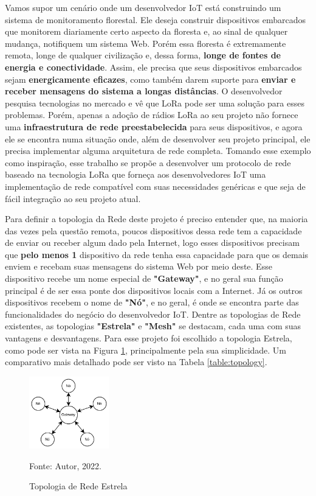 Vamos supor um cenário onde um desenvolvedor IoT está construindo um sistema
de monitoramento florestal. Ele deseja construir dispositivos embarcados que
monitorem diariamente certo aspecto da floresta e, ao sinal de qualquer mudança,
notifiquem um sistema Web. Porém essa floresta é extremamente remota, longe
de qualquer civilização e, dessa forma, \textbf{longe de fontes de energia e conectividade}.
Assim, ele precisa que seus dispositivos embarcados sejam \textbf{energicamente eficazes},
como também darem suporte para \textbf{enviar e receber mensagens do sistema a longas distâncias}.
O desenvolvedor pesquisa tecnologias no mercado e vê que LoRa pode ser uma solução para
esses problemas. Porém, apenas a adoção de rádios LoRa ao seu projeto não
fornece uma \textbf{infraestrutura de rede preestabelecida} para seus dispositivos, e agora ele se encontra
numa situação onde, além de desenvolver seu projeto principal, ele precisa
implementar alguma arquitetura de rede completa. Tomando esse exemplo como inspiração,
esse trabalho se propõe a
desenvolver um protocolo de rede baseado na tecnologia LoRa que forneça aos
desenvolvedores IoT uma implementação de rede compatível com suas necessidades
genéricas e que seja de fácil integração ao seu projeto atual.

Para definir a topologia da Rede deste projeto é preciso entender que, na maioria das vezes
pela questão remota, poucos dispositivos dessa rede tem a capacidade
de enviar ou receber algum dado pela Internet, logo esses dispositivos precisam
que \textbf{pelo menos 1} dispositivo da rede tenha essa capacidade para que os demais
enviem e recebam suas mensagens do sistema Web por meio deste. Esse dispositivo
recebe um nome especial de \textbf{"Gateway"}, e no geral sua função principal é de ser
essa ponte dos dispositivos locais com a Internet. Já os outros dispositivos recebem o nome de \textbf{"Nó"},
e no geral, é onde se encontra parte das funcionalidades do negócio do
desenvolvedor IoT. Dentre as topologias de Rede existentes, as topologias
\textbf{"Estrela"} e \textbf{"Mesh"} se destacam, cada uma com suas vantagens e desvantagens.
Para esse projeto foi escolhido a topologia Estrela, como pode ser vista
na Figura \ref{fig:topology}, principalmente pela sua simplicidade. Um 
comparativo mais detalhado pode ser visto na Tabela \ref{table:topology}.
\cite{9385408} \cite{9049146} \cite{8115793}

\begin{figure}[h!]
	\begin{center}
	\caption{Topologia de Rede Estrela}
    \includegraphics[width=0.31\textwidth]{img/topology.drawio.png}
    
    Fonte: Autor, 2022.
    \label{fig:topology}
	\end{center}
\end{figure}


